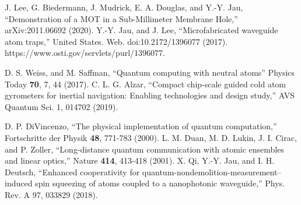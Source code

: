 \documentclass{osa-article}
\begin{document}
 \medskip


\begin{thebibliography}{99}

 J. Lee, G. Biedermann, J. Mudrick, E. A. Douglas, and Y.-Y. Jau, {} ``Demonstration of a MOT in a Sub-Millimeter Membrane Hole,'' 	arXiv:2011.06692 (2020).
 Y.-Y. Jau, and J. Lee, {} ``Microfabricated waveguide atom traps,'' United States. Web. doi:10.2172/1396077 (2017). https://www.osti.gov/servlets/purl/1396077.

 D. S. Weiss, and M. Saffman, ``Quantum computing with neutral atoms'' Physics Today \textbf{70}, 7, 44 (2017).
 C. L. G. Alzar, ``Compact chip-scale guided cold atom gyrometers for inertial navigation: Enabling technologies and design study,'' AVS Quantum Sci. 1, 014702 (2019).

 D. P. DiVincenzo, {} ``The physical implementation of quantum computation,'' {} Fortschritte der Physik \textbf{48}, 771-783 (2000).
 L. M. Duan, M. D. Lukin, J. I. Cirac, and P. Zoller, {} ``Long-distance quantum communication with atomic ensembles and linear optics,'' Nature \textbf{414}, 413-418 (2001).
 X. Qi, Y.-Y. Jau, and I. H. Deutsch, {}``Enhanced cooperativity for quantum-nondemolition-measurement–induced spin squeezing of atoms coupled to a nanophotonic waveguide,'' Phys. Rev. A 97, 033829 (2018).


\end{thebibliography}
\end{document}
